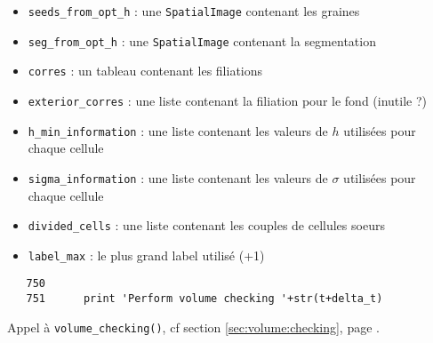 \documentclass{article}
\def \mycolor {red}
\begin{document}
\begin{itemize}
\itemsep -1ex
\item \verb|seeds_from_opt_h| : une \texttt{SpatialImage} contenant les graines 
\item \verb|seg_from_opt_h| : une \texttt{SpatialImage} contenant la segmentation
\item \verb|corres| : un tableau contenant les filiations
\item \verb|exterior_corres| : une liste contenant la filiation pour le fond (inutile ?)
\item \verb|h_min_information| : une liste contenant les valeurs de $h$ utilisées pour chaque cellule
\item \verb|sigma_information| : une liste contenant les valeurs de $\sigma$ utilisées pour chaque cellule
\item \verb|divided_cells| : une liste contenant les couples de cellules soeurs
\item \verb|label_max| : le plus grand label utilisé (+1)
\end{itemize}
\color{black}
\begin{verbatim}
   750	    
   751	    print 'Perform volume checking '+str(t+delta_t)
\end{verbatim} 
\color{\mycolor}
Appel \`a \texttt{volume\_checking()}, cf section \ref{sec:volume:checking}, page \pageref{sec:volume:checking}.
\end{document}
